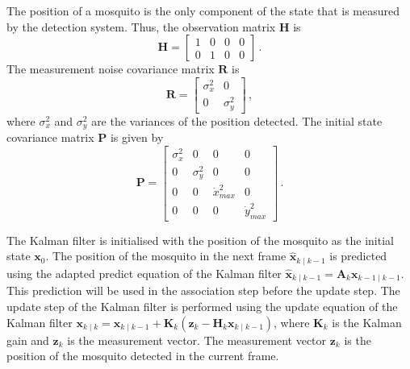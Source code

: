 The position of a mosquito is the only component of the state that is measured by the detection system. Thus, the observation matrix $\mathbf{H}$ is
\begin{equation}
    \mathbf{H} = \begin{bmatrix}
        1 & 0 & 0 & 0 \\
        0 & 1 & 0 & 0
    \end{bmatrix}\,.
\end{equation}
The measurement noise covariance matrix $\mathbf{R}$ is
\begin{equation}
    \mathbf{R} = \begin{bmatrix}
        \sigma_{x}^2 & 0            \\
        0            & \sigma_{y}^2
    \end{bmatrix}\,,
\end{equation}
where $\sigma_{x}^2$ and $\sigma_{y}^2$ are the variances of the position detected. The initial state covariance matrix $\mathbf{P}$ is given by
\begin{equation}
    \mathbf{P} = \begin{bmatrix}
        \sigma_{x}^2 & 0            & 0               & 0               \\
        0            & \sigma_{y}^2 & 0               & 0               \\
        0            & 0            & \dot{x}_{max}^2 & 0               \\
        0            & 0            & 0               & \dot{y}_{max}^2
    \end{bmatrix}\,.
\end{equation}

The Kalman filter is initialised with the position of the mosquito as the initial state $\mathbf{x}_0$. The position of the mosquito in the next frame $\mathbf{\hat{x}}_{k\mid k-1}$ is predicted using the adapted predict equation of the Kalman filter $\mathbf{\hat{x}}_{k\mid k-1} = \mathbf{A}_k \mathbf{x}_{k-1\mid k-1}$. This prediction will be used in the association step before the update step. The update step of the Kalman filter is performed using the update equation of the Kalman filter $\mathbf{x}_{k\mid k} = \mathbf{x}_{k\mid k-1} + \mathbf{K}_k \left(\mathbf{z}_k - \mathbf{H}_k \mathbf{x}_{k\mid k-1}\right)$, where $\mathbf{K}_k$ is the Kalman gain and $\mathbf{z}_k$ is the measurement vector. The measurement vector $\mathbf{z}_k$ is the position of the mosquito detected in the current frame.


